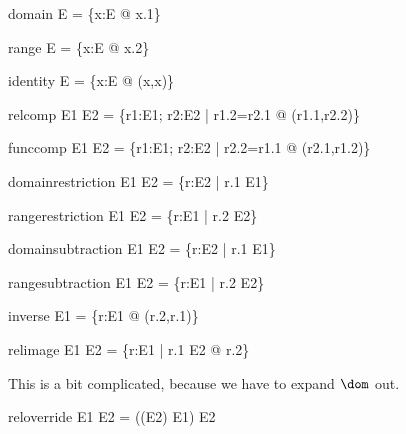 \documentclass{article}
\begin{document}
\begin{zedrule}{domain}
   \dom E = \{x:E @ x.1\}
\end{zedrule}

\begin{zedrule}{range}
   \ran E = \{x:E @ x.2\}
\end{zedrule}

\begin{zedrule}{identity}
   \id E = \{x:E @ (x,x)\}
\end{zedrule}

\begin{zedrule}{relcomp}
   E1 \comp E2 = \{r1:E1; r2:E2 | r1.2=r2.1 @ (r1.1,r2.2)\}
\end{zedrule}

\begin{zedrule}{funccomp}
   E1 \circ E2 = \{r1:E1; r2:E2 | r2.2=r1.1 @ (r2.1,r1.2)\}
\end{zedrule}

\begin{zedrule}{domainrestriction}
   E1 \dres E2 = \{r:E2 | r.1 \in E1\}
\end{zedrule}

\begin{zedrule}{rangerestriction}
   E1 \rres E2 = \{r:E1 | r.2 \in E2\}
\end{zedrule}

\begin{zedrule}{domainsubtraction}
   E1 \ndres E2 = \{r:E2 | r.1 \notin E1\}
\end{zedrule}

\begin{zedrule}{rangesubtraction}
   E1 \nrres E2 = \{r:E1 | r.2 \notin E2\}
\end{zedrule}

\begin{zedrule}{inverse}
   E1 \inv = \{r:E1 @ (r.2,r.1)\}
\end{zedrule}

\begin{zedrule}{relimage}
   E1 \limg E2 \rimg = \{r:E1 | r.1 \in E2 @ r.2\}
\end{zedrule}

This is a bit complicated, because we have to expand $\dom$ out.
\begin{zedrule}{reloverride}
   E1 \oplus E2 = ((\dom E2) \ndres E1) \cup E2
\end{zedrule}
\end{document}
